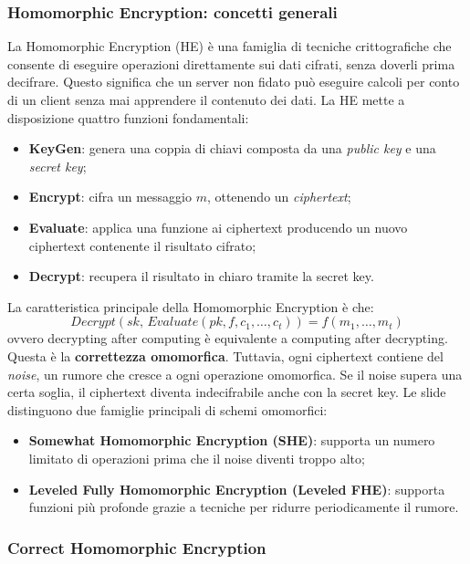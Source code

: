 \subsubsection{Homomorphic Encryption: concetti generali}

La Homomorphic Encryption (HE) è una famiglia di tecniche crittografiche che consente di eseguire operazioni direttamente sui dati cifrati, senza doverli prima decifrare.
Questo significa che un server non fidato può eseguire calcoli per conto di un client senza mai apprendere il contenuto dei dati.
La HE mette a disposizione quattro funzioni fondamentali:
\begin{itemize}
    \item \textbf{KeyGen}: genera una coppia di chiavi composta da una \textit{public key} e una \textit{secret key};
    \item \textbf{Encrypt}: cifra un messaggio $m$, ottenendo un \textit{ciphertext};
    \item \textbf{Evaluate}: applica una funzione ai ciphertext producendo un nuovo ciphertext contenente il risultato cifrato;
    \item \textbf{Decrypt}: recupera il risultato in chiaro tramite la secret key.
\end{itemize}

La caratteristica principale della Homomorphic Encryption è che:
\[
Decrypt(sk,\, Evaluate(pk, f, c_1,\dots,c_t)) = f(m_1,\dots,m_t)
\]
ovvero decrypting after computing è equivalente a computing after decrypting.
Questa è la \textbf{correttezza omomorfica}.
Tuttavia, ogni ciphertext contiene del \textit{noise}, un rumore che cresce a ogni operazione omomorfica.
Se il noise supera una certa soglia, il ciphertext diventa indecifrabile anche con la secret key.
Le slide distinguono due famiglie principali di schemi omomorfici:
\begin{itemize}
    \item \textbf{Somewhat Homomorphic Encryption (SHE)}: supporta un numero limitato di operazioni prima che il noise diventi troppo alto;
    \item \textbf{Leveled Fully Homomorphic Encryption (Leveled FHE)}: supporta funzioni più profonde grazie a tecniche per ridurre periodicamente il rumore.
\end{itemize}

\subsubsection{Correct Homomorphic Encryption}

